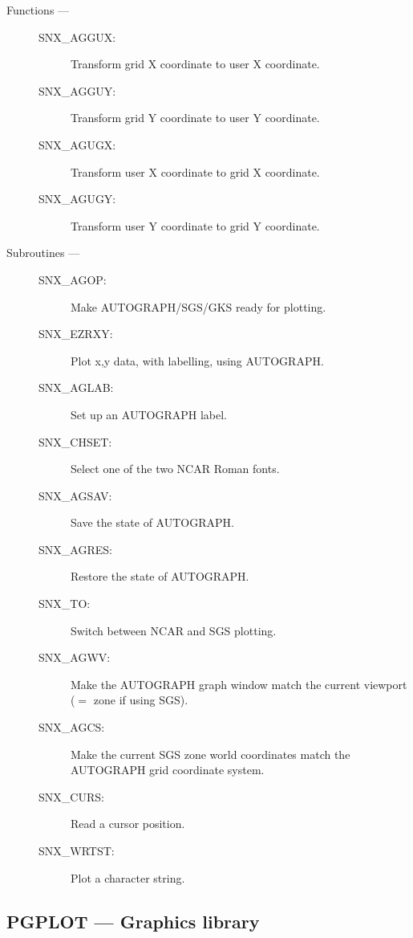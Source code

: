 \begin{description}

\item [Functions ---]

\begin{description}
\item [SNX\_AGGUX:]  Transform grid X coordinate to user X coordinate.
\item [SNX\_AGGUY:]  Transform grid Y coordinate to user Y coordinate.
\item [SNX\_AGUGX:]  Transform user X coordinate to grid X coordinate.
\item [SNX\_AGUGY:]  Transform user Y coordinate to grid Y coordinate.
\end{description}

\item [Subroutines ---]

\begin{description}
\item [SNX\_AGOP:]  Make AUTOGRAPH/SGS/GKS ready for plotting.
\item [SNX\_EZRXY:]  Plot x,y data, with labelling, using AUTOGRAPH.
\item [SNX\_AGLAB:]  Set up an AUTOGRAPH label.
\item [SNX\_CHSET:]  Select one of the two NCAR Roman fonts.
\item [SNX\_AGSAV:]  Save the state of AUTOGRAPH.
\item [SNX\_AGRES:]  Restore the state of AUTOGRAPH.
\item [SNX\_TO:]  Switch between NCAR and SGS plotting.
\item [SNX\_AGWV:]  Make the AUTOGRAPH graph window match the current viewport
 ($=$ zone if using SGS).
\item [SNX\_AGCS:]  Make the current SGS zone world coordinates match the
      AUTOGRAPH grid coordinate system.
\item [SNX\_CURS:]  Read a cursor position.
\item [SNX\_WRTST:]  Plot a character string.
\end{description}

\end{description}

\newpage

\subsection{PGPLOT --- Graphics library}

